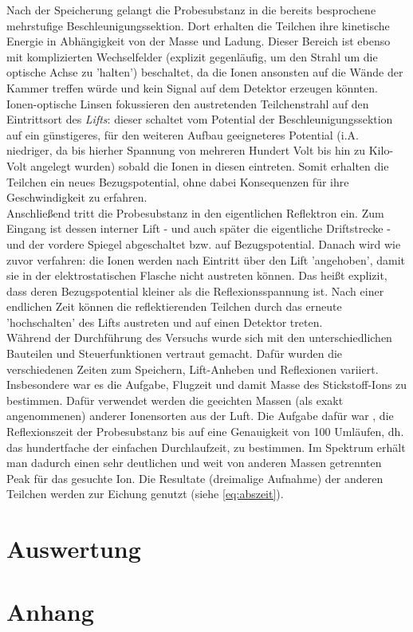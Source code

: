 \documentclass[numbers=noenddot,a4paper,notitlepage,twoside,BCOR15mm]{scrartcl}
\newcommand{\tilt}[1]{\textit{#1}}
\begin{document}
		Nach der Speicherung gelangt die Probesubstanz in die bereits besprochene mehrstufige Beschleunigungssektion. Dort erhalten die Teilchen ihre kinetische Energie in Abhängigkeit von der Masse und Ladung. Dieser Bereich ist ebenso mit komplizierten Wechselfelder (explizit gegenläufig, um den Strahl um die optische Achse zu 'halten') beschaltet, da die Ionen ansonsten auf die Wände der Kammer treffen würde und kein Signal auf dem Detektor erzeugen könnten. Ionen-optische Linsen fokussieren den austretenden Teilchenstrahl auf den Eintrittsort des \tilt{Lifts}: dieser schaltet vom Potential der Beschleunigungssektion auf ein günstigeres, für den weiteren Aufbau geeigneteres Potential (i.A. niedriger, da bis hierher Spannung von mehreren Hundert Volt bis hin zu Kilo-Volt angelegt wurden) sobald die Ionen in diesen eintreten. Somit erhalten die Teilchen ein neues Bezugspotential, ohne dabei Konsequenzen für ihre Geschwindigkeit zu erfahren.\\
		Anschließend tritt die Probesubstanz in den eigentlichen Reflektron ein. Zum Eingang ist dessen interner Lift - und auch später die eigentliche Driftstrecke - und der vordere Spiegel abgeschaltet bzw. auf Bezugspotential. Danach wird wie zuvor verfahren: die Ionen werden nach Eintritt über den Lift 'angehoben', damit sie in der elektrostatischen Flasche nicht austreten können. Das heißt explizit, dass deren Bezugspotential kleiner als die Reflexionsspannung ist. Nach einer endlichen Zeit können die reflektierenden Teilchen durch das erneute 'hochschalten' des Lifts austreten und auf einen Detektor treten.\\
		Während der Durchführung des Versuchs wurde sich mit den unterschiedlichen Bauteilen und Steuerfunktionen vertraut gemacht. Dafür wurden die verschiedenen Zeiten zum Speichern, Lift-Anheben und Reflexionen variiert. Insbesondere war es die Aufgabe, Flugzeit und damit Masse des Stickstoff-Ions zu bestimmen. Dafür verwendet werden die geeichten Massen (als exakt angenommenen) anderer Ionensorten aus der Luft. Die Aufgabe dafür war , die Reflexionszeit der Probesubstanz bis auf eine Genauigkeit von 100 Umläufen, dh. das hundertfache der einfachen Durchlaufzeit, zu bestimmen. Im Spektrum erhält man dadurch einen sehr deutlichen und weit von anderen Massen getrennten Peak für das gesuchte Ion. Die Resultate (dreimalige Aufnahme) der anderen Teilchen werden zur Eichung genutzt (siehe \autoref{eq:abszeit}).

	\newpage
	\section{Auswertung}
	
	\newpage
	\section{Anhang}

		
		
\end{document}

